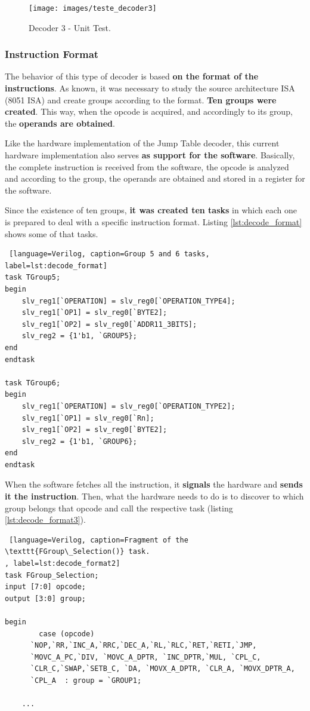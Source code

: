 \begin{figure}[H]
\centerline{
\texttt{[image: images/teste\_decoder3]}
}
\caption{Decoder 3 - Unit Test.}
\label{fig:teste1_decoder3} 
\end{figure}


\subsubsection{Instruction Format}

The behavior of this type of decoder is based \textbf{on the format of the instructions}. As known, it was necessary to study the source architecture ISA (8051 ISA) and create groups according to the format. \textbf{Ten groups were created}. This way, when the opcode is acquired, and accordingly to its group, the \textbf{operands are obtained}. 


Like the hardware implementation of the Jump Table decoder, this current hardware implementation also serves \textbf{as support for the software}. Basically, the complete instruction is received from the software, the opcode is analyzed and according to the group, the operands are obtained and stored in a register for the software.

Since the existence of ten groups, \textbf{it was created ten tasks} in which each one is prepared to deal with a specific instruction format. Listing \ref{lst:decode_format} shows some of that tasks.

\begin{lstlisting} [language=Verilog, caption=Group 5 and 6 tasks, label=lst:decode_format]
task TGroup5;
begin
    slv_reg1[`OPERATION] = slv_reg0[`OPERATION_TYPE4];
    slv_reg1[`OP1] = slv_reg0[`BYTE2];
    slv_reg1[`OP2] = slv_reg0[`ADDR11_3BITS];
    slv_reg2 = {1'b1, `GROUP5};
end
endtask
    
task TGroup6;
begin
    slv_reg1[`OPERATION] = slv_reg0[`OPERATION_TYPE2];
    slv_reg1[`OP1] = slv_reg0[`Rn];
    slv_reg1[`OP2] = slv_reg0[`BYTE2];
    slv_reg2 = {1'b1, `GROUP6};
end
endtask
\end{lstlisting}

When the software fetches all the instruction, it \textbf{signals} the hardware and \textbf{sends it the instruction}. Then, what the hardware needs to do is to discover to which group belongs that opcode and call the respective task (listing \ref{lst:decode_format3}). 

\begin{lstlisting} [language=Verilog, caption=Fragment of the \texttt{FGroup\_Selection()} task.
, label=lst:decode_format2]
task FGroup_Selection;
input [7:0] opcode;
output [3:0] group;
  
begin
		case (opcode)
      `NOP,`RR,`INC_A,`RRC,`DEC_A,`RL,`RLC,`RET,`RETI,`JMP, 
      `MOVC_A_PC,`DIV, `MOVC_A_DPTR, `INC_DPTR,`MUL, `CPL_C,
      `CLR_C,`SWAP,`SETB_C, `DA, `MOVX_A_DPTR, `CLR_A, `MOVX_DPTR_A,
      `CPL_A  : group = `GROUP1;
      
	...
\end{lstlisting}

